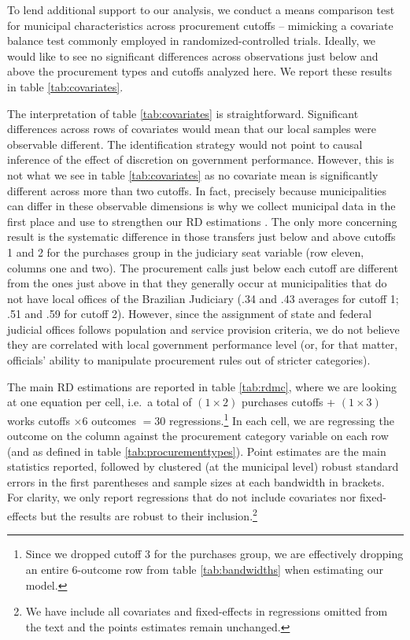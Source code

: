 \documentclass[11pt]{article}
\begin{document}
To lend additional support to our analysis, we conduct a means comparison test for municipal characteristics across procurement cutoffs -- mimicking a covariate balance test commonly employed in randomized-controlled trials. Ideally, we would like to see no significant differences across observations just below and above the procurement types and cutoffs analyzed here. We report these results in table \ref{tab:covariates}.

The interpretation of table \ref{tab:covariates} is straightforward. Significant differences across rows of covariates would mean that our local samples were observable different. The identification strategy would not point to causal inference of the effect of discretion on government performance. However, this is not what we see in table \ref{tab:covariates} as no covariate mean is significantly different across more than two cutoffs. In fact, precisely because municipalities can differ in these observable dimensions is why we collect municipal data in the first place and use to strengthen our RD estimations \citep{CalonicoRegressionDiscontinuityDesigns2018}. The only more concerning result is the systematic difference in those transfers just below and above cutoffs 1 and 2 for the purchases group in the judiciary seat variable (row eleven, columns one and two). The procurement calls just below each cutoff are different from the ones just above in that they generally occur at municipalities that do not have local offices of the Brazilian Judiciary (.34 and .43 averages for cutoff 1; .51 and .59 for cutoff 2). However, since the assignment of state and federal judicial offices follows population and service provision criteria, we do not believe they are correlated with local government performance level (or, for that matter, officials' ability to manipulate procurement rules out of stricter categories).

The main RD estimations are reported in table \ref{tab:rdmc}, where we are looking at one equation per cell, i.e.~a total of $(1 \times 2)$ purchases cutoffs + $(1 \times 3)$ works cutoffs $\times 6$ outcomes $= 30$ regressions.\footnote{Since we dropped cutoff 3 for the purchases group, we are effectively dropping an entire 6-outcome row from table \ref{tab:bandwidths} when estimating our model.} In each cell, we are regressing the outcome on the column against the procurement category variable on each row (and as defined in table \ref{tab:procurementtypes}). Point estimates are the main statistics reported, followed by clustered (at the municipal level) robust standard errors in the first parentheses and sample sizes at each bandwidth in brackets. For clarity, we only report regressions that do not include covariates nor fixed-effects but the results are robust to their inclusion.\footnote{We have include all covariates and fixed-effects in regressions omitted from the text and the points estimates remain unchanged.}
\end{document}

